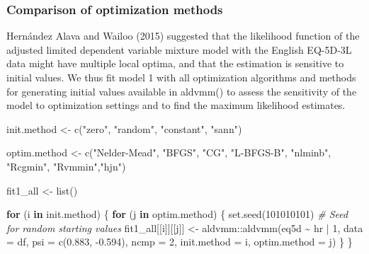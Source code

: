 \documentclass[
]{article}
\newenvironment{Shaded}{\begin{snugshade}}{\end{snugshade}}
\newcommand{\AttributeTok}[1]{\textcolor[rgb]{0.77,0.63,0.00}{#1}}
\newcommand{\CommentTok}[1]{\textcolor[rgb]{0.56,0.35,0.01}{\textit{#1}}}
\newcommand{\ControlFlowTok}[1]{\textcolor[rgb]{0.13,0.29,0.53}{\textbf{#1}}}
\newcommand{\DecValTok}[1]{\textcolor[rgb]{0.00,0.00,0.81}{#1}}
\newcommand{\FloatTok}[1]{\textcolor[rgb]{0.00,0.00,0.81}{#1}}
\newcommand{\FunctionTok}[1]{\textcolor[rgb]{0.00,0.00,0.00}{#1}}
\newcommand{\NormalTok}[1]{#1}
\newcommand{\OtherTok}[1]{\textcolor[rgb]{0.56,0.35,0.01}{#1}}
\newcommand{\SpecialCharTok}[1]{\textcolor[rgb]{0.00,0.00,0.00}{#1}}
\newcommand{\StringTok}[1]{\textcolor[rgb]{0.31,0.60,0.02}{#1}}
\begin{document}
\hypertarget{comparison-of-optimization-methods}{%
\subsubsection{Comparison of optimization methods}\label{comparison-of-optimization-methods}}

Hernández Alava and Wailoo (2015) suggested that the likelihood function of the adjusted limited dependent variable mixture model with the English EQ-5D-3L data might have multiple local optima, and that the estimation is sensitive to initial values. We thus fit model 1 with all optimization algorithms and methods for generating initial values available in aldvmm() to assess the sensitivity of the model to optimization settings and to find the maximum likelihood estimates.

\begin{Shaded}
\begin{Highlighting}[]
\NormalTok{init.method }\OtherTok{\textless{}{-}} \FunctionTok{c}\NormalTok{(}\StringTok{"zero"}\NormalTok{, }\StringTok{"random"}\NormalTok{, }\StringTok{"constant"}\NormalTok{, }\StringTok{"sann"}\NormalTok{)}

\NormalTok{optim.method }\OtherTok{\textless{}{-}} \FunctionTok{c}\NormalTok{(}\StringTok{"Nelder{-}Mead"}\NormalTok{, }\StringTok{"BFGS"}\NormalTok{, }\StringTok{"CG"}\NormalTok{, }\StringTok{"L{-}BFGS{-}B"}\NormalTok{, }\StringTok{"nlminb"}\NormalTok{, }\StringTok{"Rcgmin"}\NormalTok{, }
                  \StringTok{"Rvmmin"}\NormalTok{,}\StringTok{"hjn"}\NormalTok{)}

\NormalTok{fit1\_all }\OtherTok{\textless{}{-}} \FunctionTok{list}\NormalTok{()}

\ControlFlowTok{for}\NormalTok{ (i }\ControlFlowTok{in}\NormalTok{ init.method) \{}
  \ControlFlowTok{for}\NormalTok{ (j }\ControlFlowTok{in}\NormalTok{ optim.method) \{}
    \FunctionTok{set.seed}\NormalTok{(}\DecValTok{101010101}\NormalTok{) }\CommentTok{\# Seed for random starting values}
\NormalTok{    fit1\_all[[i]][[j]] }\OtherTok{\textless{}{-}}\NormalTok{ aldvmm}\SpecialCharTok{::}\FunctionTok{aldvmm}\NormalTok{(eq5d }\SpecialCharTok{\textasciitilde{}}\NormalTok{ hr }\SpecialCharTok{|} \DecValTok{1}\NormalTok{,}
                                         \AttributeTok{data         =}\NormalTok{ df,}
                                         \AttributeTok{psi          =} \FunctionTok{c}\NormalTok{(}\FloatTok{0.883}\NormalTok{, }\SpecialCharTok{{-}}\FloatTok{0.594}\NormalTok{),}
                                         \AttributeTok{ncmp         =} \DecValTok{2}\NormalTok{,}
                                         \AttributeTok{init.method  =}\NormalTok{ i,}
                                         \AttributeTok{optim.method =}\NormalTok{ j)}
\NormalTok{  \}}
\NormalTok{\}}
\end{Highlighting}
\end{Shaded}
\end{document}
